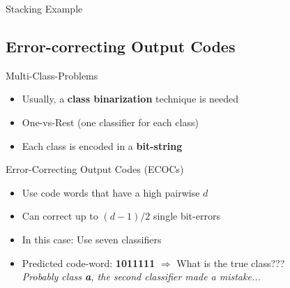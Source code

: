 \begin{frame}{Stacking Example}{}
	\vspace*{-6mm}
	
\end{frame}


\subsection{Error-correcting Output Codes}

\begin{frame}{Multi-Class-Problems}{}
	\begin{itemize}
		\item Usually, a \textbf{class binarization} technique is needed
		\item One-vs-Rest (one classifier for each class)
		\item Each class is encoded in a \textbf{bit-string}
	\end{itemize}
	
	\vspace*{3mm}
\end{frame}


\begin{frame}{Error-Correcting Output Codes (ECOCs)}{}
	\begin{itemize}
		\item Use code words that have a high pairwise  $d$
		\item Can correct up to $(d - 1) / 2$ single bit-errors
		\item In this case: Use seven classifiers
		
		\item Predicted code-word: \textbf{1011111} $\Rightarrow$ What is the true class??? \\
			\textit{Probably class \textbf{a}, the second classifier made a mistake...}
	\end{itemize}
\end{frame}


